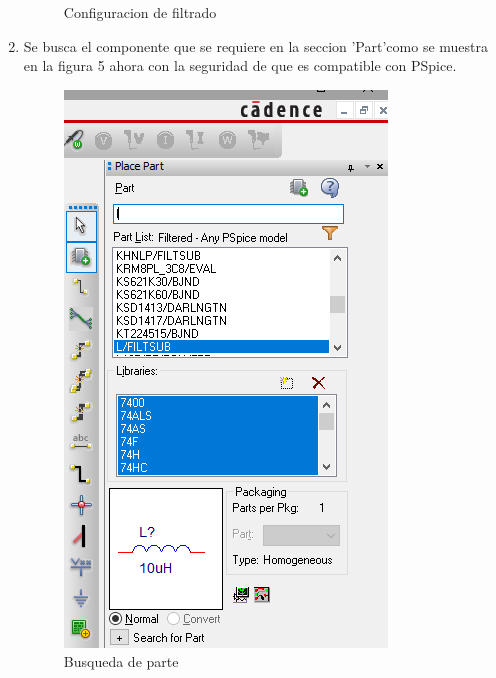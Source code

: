 ﻿\documentclass[letterpaper]{article}
\begin{document}
\begin{large}
\begin{enumerate}
\begin{figure}[htbp]
                \caption{Configuracion de filtrado}
                \label{fig:Configuracion de filtro}
            \end{figure} \newpage
            \item Se busca el componente que se requiere en la seccion 'Part'como se muestra en la figura 5 ahora con la seguridad de que es compatible con PSpice.\\
            \begin{figure}[htbp]
                \centering
                \includegraphics[scale=0.5]{cp2.png}
                \caption{Busqueda de parte}
                \label{fig:Busqueda de parte}

\end{figure}
\end{enumerate}
\end{large}
\end{document}
